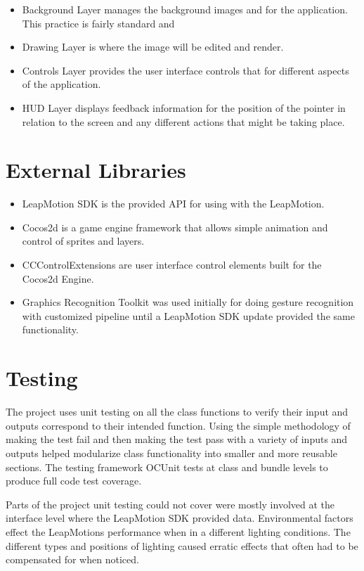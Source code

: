 \begin{itemize}
\item Background Layer manages the background images and for the application. This practice is fairly standard and 
\item Drawing Layer is where the image will be edited and render. 
\item Controls Layer provides the user interface controls that for different aspects of the application.
\item HUD Layer displays feedback information for the position of the pointer in relation to the screen and any different actions that might be taking place. 
\end{itemize}

\section{External Libraries}

\begin{itemize}
\item LeapMotion SDK is the provided API for using with the LeapMotion.\cite{leapmotion}
\item Cocos2d is a game engine framework that allows simple animation and control of sprites and layers. \cite{cocos2d}
\item CCControlExtensions are user interface control elements built for the Cocos2d Engine. \cite{cccontrolextension}
\item Graphics Recognition Toolkit was used initially for doing gesture recognition with customized pipeline until a LeapMotion SDK update provided the same functionality. \cite{GRT}

\end{itemize}

\section{Testing}

The project uses unit testing on all the class functions to verify their input and outputs correspond to their intended function. Using the simple methodology of making the test fail and then making the test pass with a variety of inputs and outputs helped modularize class functionality into smaller and more reusable sections. The testing framework OCUnit tests at class and bundle levels to produce full code test coverage. \cite{appleapi}

Parts of the project unit testing could not cover were mostly involved at the interface level where the LeapMotion SDK provided data. Environmental factors effect the LeapMotions performance when in a different lighting conditions. The different types and positions of lighting caused erratic effects that often had to be compensated for when noticed. 

